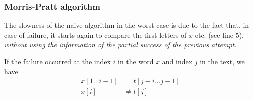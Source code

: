 
%
\begin{frame}
\frametitle{Morris-Pratt algorithm}

The slowness of the naive algorithm in the worst case is due to the
fact that, in case of failure, it starts again to compare the first
letters of \(x\) etc. (see line \(5\)), \emph{without using the
  information of the partial success of the previous attempt.}

\bigskip

If the failure occurred at the index \(i\) in the word \(x\) and index
\(j\) in the text, we have
\begin{align*}
   x[1 \dots i-1] 
&= t[j-i \dots j-1]\\
x[i] &\neq t[j]
\end{align*}

\end{frame}

%
\renewcommand\arraystretch{0.95}

